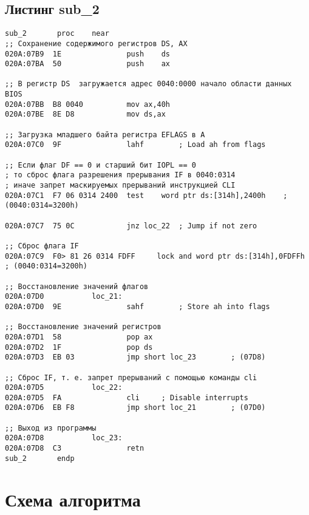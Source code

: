 \subsection*{Листинг sub\_2} 
\begin{lstlisting}[style={asm}]
				sub_2		proc	near
;; Сохранение содержимого регистров DS, AX
020A:07B9  1E				push	ds
020A:07BA  50				push	ax

;; В регистр DS  загружается адрес 0040:0000 начало области данных BIOS
020A:07BB  B8 0040			mov	ax,40h
020A:07BE  8E D8			mov	ds,ax

;; Загрузка младшего байта регистра EFLAGS в A
020A:07C0  9F				lahf		; Load ah from flags

;; Если флаг DF == 0 и старший бит IOPL == 0
; то сброс флага разрешения прерывания IF в 0040:0314
; иначе запрет маскируемых прерываний инструкцией CLI
020A:07C1  F7 06 0314 2400	test	word ptr ds:[314h],2400h	; (0040:0314=3200h)

020A:07C7  75 0C			jnz	loc_22	; Jump if not zero

;; Сброс флага IF 
020A:07C9  F0> 81 26 0314 FDFF	   lock	and	word ptr ds:[314h],0FDFFh	; (0040:0314=3200h)

;; Восстановление значений флагов
020A:07D0			loc_21:
020A:07D0  9E				sahf		; Store ah into flags

;; Восстановление значений регистров
020A:07D1  58				pop	ax
020A:07D2  1F				pop	ds
020A:07D3  EB 03			jmp	short loc_23		; (07D8)

;; Сброс IF, т. е. запрет прерываний с помощью команды cli
020A:07D5			loc_22:
020A:07D5  FA				cli		; Disable interrupts
020A:07D6  EB F8			jmp	short loc_21		; (07D0)

;; Выход из программы
020A:07D8			loc_23:
020A:07D8  C3				retn
sub_2		endp
\end{lstlisting}

\clearpage

\section*{Схема алгоритма}





